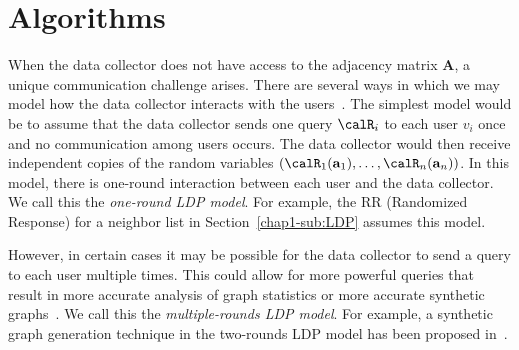 \section{Algorithms}
\label{chap1-sec:algorithms}
When the data collector does not have access to the adjacency matrix
$\textbf{A}$, a unique communication challenge arises. There are several ways in
which we may model how the data collector interacts with the users~\cite{Duchi_FOCS13,Joseph_SODA20,Qin_CCS17}.
The simplest model would be to assume that 
the data collector sends 
one query $\calR_i$ to each user $v_i$ once 
and no communication among users occurs.
The data collector would then receive independent copies of the random variables
$(\calR_1(\textbf{a}_1), \ldots, \calR_n(\textbf{a}_n))$. 
In this model, there is one-round interaction between each user and the data collector. 
We call this the
\textit{one-round LDP model}. 
For example, the RR (Randomized Response) for a neighbor list in Section~\ref{chap1-sub:LDP} assumes this model.

However, in certain cases it may be possible 
for the data collector to send a query to each user multiple times. 
This could allow for more powerful queries that result in more accurate analysis
of graph statistics or more accurate synthetic graphs~\cite{Qin_CCS17}. 
We call this the \textit{multiple-rounds LDP model}. 
For example, a synthetic graph generation technique in the two-rounds LDP model has been proposed in~\cite{Qin_CCS17}.


% 

